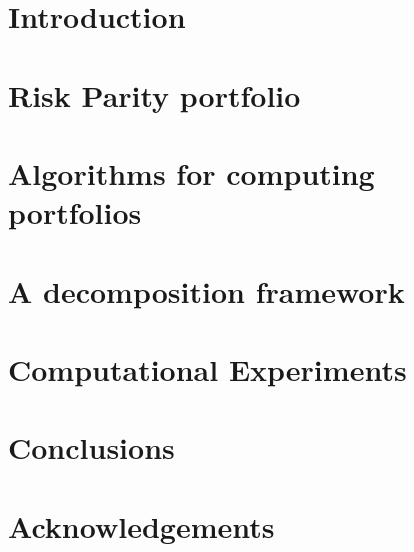 \documentclass[a4paper, oneside, 11pt, titlepage]{book}
\numberwithin{equation}{section}
\begin{document}
\tableofcontents\clearpage

\chapter{Introduction}


\chapter{Risk Parity portfolio}


\chapter{Algorithms for computing portfolios}


\chapter{A decomposition framework}


\chapter{Computational Experiments}


\chapter{Conclusions}
\chapter{Acknowledgements}
\clearpage

\begin{thebibliography}{9}

\end{thebibliography}
\end{document}
